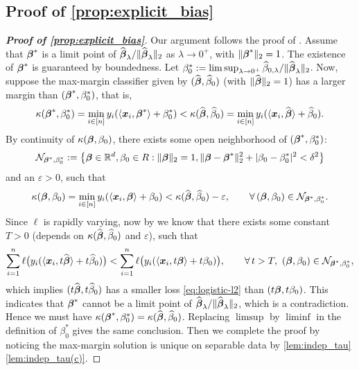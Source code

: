 \subsection{Proof of \cref{prop:explicit_bias}}
\begin{proof}[\textbf{Proof of \cref{prop:explicit_bias}}]
    Our argument follows the proof of \cite[Theorem 2.1]{Soudry_implicit_bias}. Assume that ${\boldsymbol{\beta}}^*$ is a limit point of $\widehat {{\boldsymbol{\beta}}}_\lambda/\| \widehat {{\boldsymbol{\beta}}}_\lambda \|_2$ as $\lambda \to 0^+$, with $\| {\boldsymbol{\beta}}^* \|_2 = 1$. The existence of ${\boldsymbol{\beta}}^*$ is guaranteed by boundedness. Let $\beta_0^* := \limsup_{\lambda \to 0^+} \widehat\beta_{0, \lambda}/\| \widehat {{\boldsymbol{\beta}}}_\lambda \|_2$. Now, suppose the max-margin classifier given by  $(\widehat{{\boldsymbol{\beta}}}, \widehat\beta_0)$ (with $\| \widehat{{\boldsymbol{\beta}}} \|_2 = 1$) has a larger margin than $({\boldsymbol{\beta}}^*, \beta_0^*)$, that is,
    \begin{equation*}
        \kappa({\boldsymbol{\beta}}^*, \beta_0^*) = \min_{i \in [n]} y_i ( \langle \text{\boldmath $x$}_i, {\boldsymbol{\beta}}^* \rangle + \beta_0^* )
        <
        \kappa(\widehat{{\boldsymbol{\beta}}}, \widehat\beta_0) = \min_{i \in [n]} y_i ( \langle \text{\boldmath $x$}_i, \widehat{{\boldsymbol{\beta}}} \rangle + \widehat\beta_0 ).
    \end{equation*}
    By continuity of $\kappa({\boldsymbol{\beta}}, \beta_0)$, there exists some open neighborhood of $({\boldsymbol{\beta}}^*, \beta_0^*)$:
    \begin{equation*}
        \mathcal{N}_{{\boldsymbol{\beta}}^*, \beta_0^*} := \left\{
        {\boldsymbol{\beta}} \in \mathbb{R}^d, \beta_0 \in R: \|{\boldsymbol{\beta}}\|_2 = 1, \| {\boldsymbol{\beta}} - {\boldsymbol{\beta}}^* \|_2^2 + |\beta_0 - \beta_0^*|^2 < \delta^2 
        \right\}
    \end{equation*}
    and an $\varepsilon > 0$, such that
    \begin{equation*}
        \kappa({\boldsymbol{\beta}}, \beta_0) = \min_{i \in [n]} y_i ( \langle \text{\boldmath $x$}_i, {\boldsymbol{\beta}} \rangle + \beta_0 ) < \kappa(\widehat{{\boldsymbol{\beta}}}, \widehat\beta_0) - \varepsilon, \qquad \forall\, ({\boldsymbol{\beta}}, \beta_0) \in \mathcal{N}_{{\boldsymbol{\beta}}^*, \beta_0^*}.
    \end{equation*}
    Since $\ell$ is rapidly varying, now by \cite[Lemma 2.3]{Soudry_implicit_bias} we know that there exists some constant $T > 0$ (depends on $\kappa(\widehat{{\boldsymbol{\beta}}}, \widehat\beta_0)$ and $\varepsilon$), such that
    \begin{equation*}
        \sum_{i=1}^n \ell\bigl(y_i ( \langle \text{\boldmath $x$}_i, t \widehat{{\boldsymbol{\beta}}} \rangle + t \widehat\beta_0 ) \bigr)
        <
        \sum_{i=1}^n \ell\bigl(y_i ( \langle \text{\boldmath $x$}_i, t {\boldsymbol{\beta}} \rangle + t \beta_0 ) \bigr)
        , \qquad \forall\, t > T , \  ({\boldsymbol{\beta}}, \beta_0) \in \mathcal{N}_{{\boldsymbol{\beta}}^*, \beta_0^*},
    \end{equation*}
    which implies $(t \widehat{{\boldsymbol{\beta}}}, t \widehat\beta_0)$ has a smaller loss \cref{eq:logistic-l2} than $(t {\boldsymbol{\beta}}, t \beta_0)$. This indicates that ${\boldsymbol{\beta}}^*$ cannot be a limit point of $\widehat {{\boldsymbol{\beta}}}_\lambda/\| \widehat {{\boldsymbol{\beta}}}_\lambda \|_2$, which is a contradiction. Hence we must have $\kappa({\boldsymbol{\beta}}^*, \beta_0^*) = \kappa(\widehat{{\boldsymbol{\beta}}}, \widehat\beta_0)$. Replacing $\limsup$ by $\liminf$ in the definition of $\beta_0^*$ gives the same conclusion. Then we complete the proof by noticing the max-margin solution is unique on separable data by \cref{lem:indep_tau}\ref{lem:indep_tau(c)}.
\end{proof}
